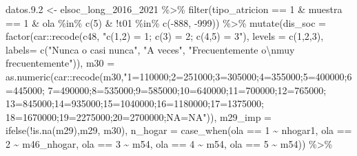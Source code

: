 \documentclass[
  12pt,
]{book}
\newenvironment{Shaded}{\begin{snugshade}}{\end{snugshade}}
\newcommand{\AttributeTok}[1]{\textcolor[rgb]{0.77,0.63,0.00}{#1}}
\newcommand{\DecValTok}[1]{\textcolor[rgb]{0.00,0.00,0.81}{#1}}
\newcommand{\FloatTok}[1]{\textcolor[rgb]{0.00,0.00,0.81}{#1}}
\newcommand{\FunctionTok}[1]{\textcolor[rgb]{0.00,0.00,0.00}{#1}}
\newcommand{\NormalTok}[1]{#1}
\newcommand{\OtherTok}[1]{\textcolor[rgb]{0.56,0.35,0.01}{#1}}
\newcommand{\SpecialCharTok}[1]{\textcolor[rgb]{0.00,0.00,0.00}{#1}}
\newcommand{\StringTok}[1]{\textcolor[rgb]{0.31,0.60,0.02}{#1}}
\begin{document}
\begin{Shaded}
\begin{Highlighting}[]
\NormalTok{datos.}\FloatTok{9.2} \OtherTok{\textless{}{-}}\NormalTok{ elsoc\_long\_2016\_2021 }\SpecialCharTok{\%\textgreater{}\%} 
  \FunctionTok{filter}\NormalTok{(tipo\_atricion }\SpecialCharTok{==} \DecValTok{1} \SpecialCharTok{\&}\NormalTok{ muestra }\SpecialCharTok{==} \DecValTok{1} \SpecialCharTok{\&}\NormalTok{ ola }\SpecialCharTok{\%in\%} \FunctionTok{c}\NormalTok{(}\DecValTok{5}\NormalTok{) }\SpecialCharTok{\&} \SpecialCharTok{!}\NormalTok{t01 }\SpecialCharTok{\%in\%} \FunctionTok{c}\NormalTok{(}\SpecialCharTok{{-}}\DecValTok{888}\NormalTok{, }\SpecialCharTok{{-}}\DecValTok{999}\NormalTok{)) }\SpecialCharTok{\%\textgreater{}\%} 
  \FunctionTok{mutate}\NormalTok{(}\AttributeTok{dis\_soc =} \FunctionTok{factor}\NormalTok{(car}\SpecialCharTok{::}\FunctionTok{recode}\NormalTok{(c48, }\StringTok{"c(1,2) = 1; c(3) = 2; c(4,5) = 3"}\NormalTok{),}
                               \AttributeTok{levels =} \FunctionTok{c}\NormalTok{(}\DecValTok{1}\NormalTok{,}\DecValTok{2}\NormalTok{,}\DecValTok{3}\NormalTok{), }\AttributeTok{labels=} \FunctionTok{c}\NormalTok{(}\StringTok{"Nunca o casi nunca"}\NormalTok{, }\StringTok{"A veces"}\NormalTok{,}
                                         \StringTok{"Frecuentemente o}\SpecialCharTok{\textbackslash{}n}\StringTok{muy frecuentemente"}\NormalTok{)),}
         \AttributeTok{m30 =} \FunctionTok{as.numeric}\NormalTok{(car}\SpecialCharTok{::}\FunctionTok{recode}\NormalTok{(m30,}\StringTok{"1=110000;2=251000;3=305000;4=355000;5=400000;6=445000;}
\StringTok{                                           7=490000;8=535000;9=585000;10=640000;11=700000;12=765000;}
\StringTok{                                           13=845000;14=935000;15=1040000;16=1180000;17=1375000;}
\StringTok{                                           18=1670000;19=2275000;20=2700000;NA=NA"}\NormalTok{)),}
         \AttributeTok{m29\_imp =} \FunctionTok{ifelse}\NormalTok{(}\SpecialCharTok{!}\FunctionTok{is.na}\NormalTok{(m29),m29, m30),}
         \AttributeTok{n\_hogar =} \FunctionTok{case\_when}\NormalTok{(ola }\SpecialCharTok{==} \DecValTok{1} \SpecialCharTok{\textasciitilde{}}\NormalTok{ nhogar1, ola }\SpecialCharTok{==} \DecValTok{2} \SpecialCharTok{\textasciitilde{}}\NormalTok{ m46\_nhogar,}
\NormalTok{                             ola }\SpecialCharTok{==} \DecValTok{3} \SpecialCharTok{\textasciitilde{}}\NormalTok{ m54, ola }\SpecialCharTok{==} \DecValTok{4} \SpecialCharTok{\textasciitilde{}}\NormalTok{ m54, ola }\SpecialCharTok{==} \DecValTok{5} \SpecialCharTok{\textasciitilde{}}\NormalTok{ m54)) }\SpecialCharTok{\%\textgreater{}\%}

\end{Highlighting}
\end{Shaded}
\end{document}
